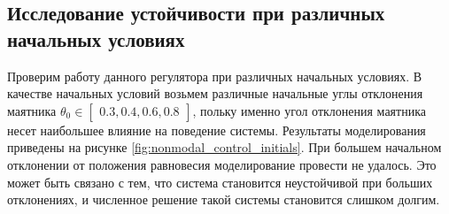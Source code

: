 \subsection{Исследование устойчивости при различных начальных условиях}
Проверим работу данного регулятора при различных начальных условиях. 
В качестве начальных условий возьмем различные начальные углы отклонения маятника $\theta_0 \in \begin{bmatrix}0.3, 0.4, 0.6, 0.8\end{bmatrix}$, польку именно 
угол отклонения маятника несет наибольшее влияние на поведение системы. Результаты 
моделирования приведены на рисунке \ref{fig:nonmodal_control_initials}. 
При большем начальном отклонении от положения равновесия моделирование провести не удалось. Это может быть связано с тем, 
что система становится неустойчивой при больших отклонениях, и численное решение такой системы становится слишком долгим. 
